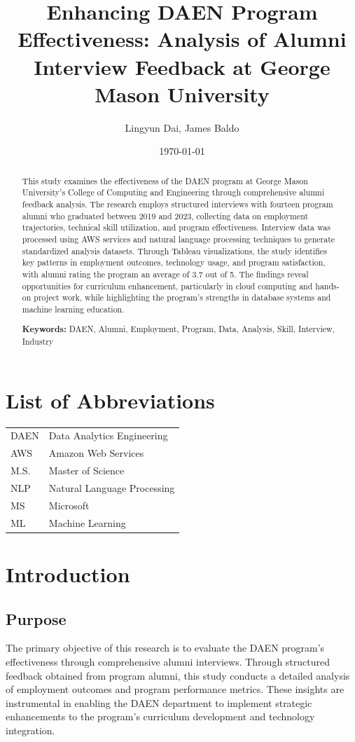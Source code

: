 \documentclass[12pt,a4paper]{article}
\title{\textbf{Enhancing DAEN Program Effectiveness: Analysis of Alumni Interview Feedback at George Mason University}}
\author{Lingyun Dai, James Baldo}
\date{\today}
\begin{document}
\maketitle

\begin{abstract}
This study examines the effectiveness of the DAEN program at George Mason University's College of Computing and Engineering through comprehensive alumni feedback analysis. The research employs structured interviews with fourteen program alumni who graduated between 2019 and 2023, collecting data on employment trajectories, technical skill utilization, and program effectiveness. Interview data was processed using AWS services and natural language processing techniques to generate standardized analysis datasets. Through Tableau visualizations, the study identifies key patterns in employment outcomes, technology usage, and program satisfaction, with alumni rating the program an average of 3.7 out of 5. The findings reveal opportunities for curriculum enhancement, particularly in cloud computing and hands-on project work, while highlighting the program's strengths in database systems and machine learning education.

\textbf{Keywords:} DAEN, Alumni, Employment, Program, Data, Analysis, Skill, Interview, Industry
\end{abstract}

\newpage
\tableofcontents
\newpage

\section*{List of Abbreviations}
\begin{tabular}{ll}
DAEN & Data Analytics Engineering\\
AWS & Amazon Web Services\\
M.S. & Master of Science\\
NLP & Natural Language Processing\\
MS & Microsoft\\
ML & Machine Learning\\
\end{tabular}
\newpage

\section{Introduction}
\subsection{Purpose}
The primary objective of this research is to evaluate the DAEN 
program's effectiveness through comprehensive alumni interviews. Through structured feedback 
obtained from program alumni, this study conducts a 
detailed analysis of employment outcomes and program performance 
metrics. These insights are instrumental in enabling the DAEN 
department to implement strategic enhancements to the program's curriculum development and technology integration.
\end{document}
